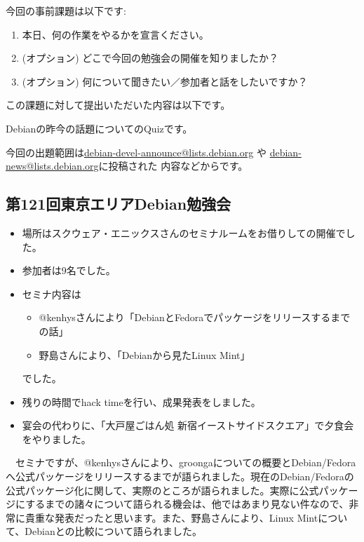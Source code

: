 \documentclass[mingoth,a4paper]{jsarticle}
\begin{document}

今回の事前課題は以下です:
\begin{enumerate}
\item 本日、何の作業をやるかを宣言ください。
\item (オプション) どこで今回の勉強会の開催を知りましたか？
\item (オプション) 何について聞きたい／参加者と話をしたいですか？
\end{enumerate}
この課題に対して提出いただいた内容は以下です。
\begin{multicols}{2}
{\small

}
\end{multicols}


 Debianの昨今の話題についてのQuizです。

今回の出題範囲は\url{debian-devel-announce@lists.debian.org} や \url{debian-news@lists.debian.org}に投稿された
内容などからです。

\begin{multicols}{2}

\end{multicols}


\subsection{第121回東京エリアDebian勉強会}

\begin{itemize}
\item 場所はスクウェア・エニックスさんのセミナルームをお借りしての開催でした。
\item 参加者は9名でした。
\item セミナ内容は 
\begin{itemize}
\item @kenhysさんにより「DebianとFedoraでパッケージをリリースするまでの話」
\item 野島さんにより、「Debianから見たLinux Mint」
\end{itemize}
でした。
\item 残りの時間でhack timeを行い、成果発表をしました。
\item 宴会の代わりに、「大戸屋ごはん処 新宿イーストサイドスクエア」で夕食会をやりました。
\end{itemize} 

　セミナですが、@kenhysさんにより、groongaについての概要とDebian/Fedoraへ公式パッケージをリリースするまでが語られました。現在のDebian/Fedoraの公式パッケージ化に関して、実際のところが語られました。実際に公式パッケージにするまでの諸々について語られる機会は、他ではあまり見ない件なので、非常に貴重な発表だったと思います。また、野島さんにより、Linux Mintについて、Debianとの比較について語られました。
\end{document}

